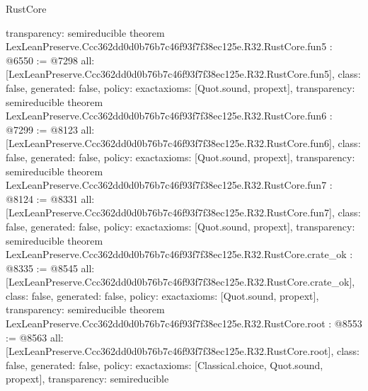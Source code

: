 \begin{lexlean}{RustCore}
\begin{coremodule}
{  transparency: semireducible
}
theorem LexLeanPreserve.Ccc362dd0d0b76b7c46f93f7f38ec125e.R32.RustCore.fun5 : @6550 := @7298 {
  all: [LexLeanPreserve.Ccc362dd0d0b76b7c46f93f7f38ec125e.R32.RustCore.fun5],
  class: false,
  generated: false,
  policy: exact{axioms: [Quot.sound, propext]},
  transparency: semireducible
}
theorem LexLeanPreserve.Ccc362dd0d0b76b7c46f93f7f38ec125e.R32.RustCore.fun6 : @7299 := @8123 {
  all: [LexLeanPreserve.Ccc362dd0d0b76b7c46f93f7f38ec125e.R32.RustCore.fun6],
  class: false,
  generated: false,
  policy: exact{axioms: [Quot.sound, propext]},
  transparency: semireducible
}
theorem LexLeanPreserve.Ccc362dd0d0b76b7c46f93f7f38ec125e.R32.RustCore.fun7 : @8124 := @8331 {
  all: [LexLeanPreserve.Ccc362dd0d0b76b7c46f93f7f38ec125e.R32.RustCore.fun7],
  class: false,
  generated: false,
  policy: exact{axioms: [Quot.sound, propext]},
  transparency: semireducible
}
theorem LexLeanPreserve.Ccc362dd0d0b76b7c46f93f7f38ec125e.R32.RustCore.crate_ok : @8335 := @8545 {
  all: [LexLeanPreserve.Ccc362dd0d0b76b7c46f93f7f38ec125e.R32.RustCore.crate_ok],
  class: false,
  generated: false,
  policy: exact{axioms: [Quot.sound, propext]},
  transparency: semireducible
}
theorem LexLeanPreserve.Ccc362dd0d0b76b7c46f93f7f38ec125e.R32.RustCore.root : @8553 := @8563 {
  all: [LexLeanPreserve.Ccc362dd0d0b76b7c46f93f7f38ec125e.R32.RustCore.root],
  class: false,
  generated: false,
  policy: exact{axioms: [Classical.choice, Quot.sound, propext]},
  transparency: semireducible
}


\end{coremodule}
\end{lexlean}
